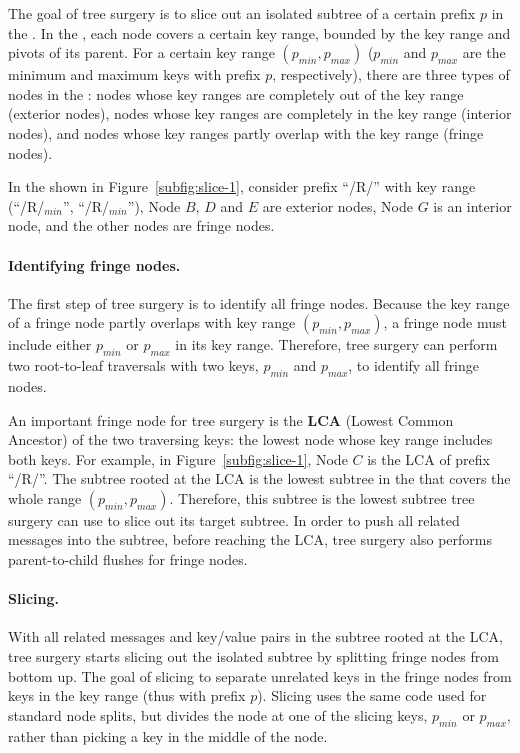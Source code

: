 The goal of tree surgery is to slice out an isolated subtree of a certain
prefix $p$ in the \bet.
In the \bet, each node covers a certain key range, bounded by the key range and
pivots of its parent.
For a certain key range $(p_{min}, p_{max})$ ($p_{min}$ and $p_{max}$ are the
minimum and maximum keys with prefix $p$, respectively), there are three types
of nodes in the \bet:
nodes whose key ranges are completely out of the key range (exterior nodes),
nodes whose key ranges are completely in the key range (interior nodes),
and nodes whose key ranges partly overlap with the key range (fringe nodes).

In the \bet shown in Figure~\ref{subfig:slice-1},
consider prefix ``/R/'' with key range (``/R/$_{min}$'', ``/R/$_{min}$''),
Node $B$, $D$ and $E$ are exterior nodes, Node $G$ is an interior node,
and the other nodes are fringe nodes.

\paragraph{Identifying fringe nodes.}
The first step of tree surgery is to identify all fringe nodes.
Because the key range of a fringe node partly overlaps with key range
$(p_{min}, p_{max})$,
a fringe node must include either $p_{min}$ or $p_{max}$ in its key range.
Therefore, tree surgery can perform two root-to-leaf traversals with two keys,
$p_{min}$ and $p_{max}$, to identify all fringe nodes.

An important fringe node for tree surgery is the \textbf{LCA}
(Lowest Common Ancestor) of the two traversing keys: the lowest \bet node
whose key range includes both keys.
For example, in Figure~\ref{subfig:slice-1}, Node $C$ is the LCA of prefix
``/R/''.
The subtree rooted at the LCA is the lowest subtree in the \bet that covers
the whole range $(p_{min}, p_{max})$.
Therefore, this subtree is the lowest subtree tree surgery can use to slice out
its target subtree.
In order to push all related messages into the subtree, before reaching the LCA,
tree surgery also performs parent-to-child flushes for fringe nodes.

\paragraph{Slicing.}
With all related messages and key/value pairs in the subtree rooted at the LCA,
tree surgery starts slicing out the isolated subtree
by splitting fringe nodes from bottom up.
The goal of slicing to separate unrelated keys in the fringe nodes
from keys in the key range (thus with prefix $p$).
Slicing uses the same code used for standard \bet node splits, but
divides the node at one of the slicing keys, $p_{min}$ or $p_{max}$, rather than
picking a key in the middle of the node.

